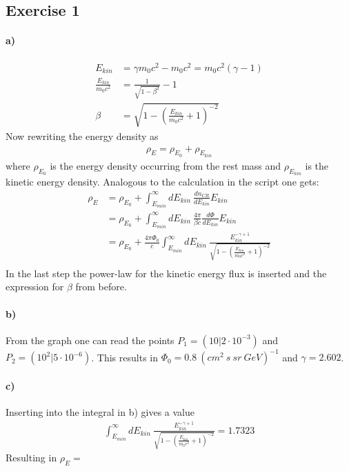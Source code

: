 \documentclass[10pt,a4paper]{article}
\begin{document}
\subsection*{Exercise 1}
\paragraph{a)}
\begin{align*}
E_{kin} &= \gamma m_0 c^2 - m_0 c^2 = m_0 c^2 (\gamma - 1) \\
\frac{E_{kin}}{m_0 c^2} &= \frac{1}{\sqrt{1-\beta^2}} - 1 \\
\beta &= \sqrt{1-\left(\frac{E_{kin}}{m_0 c^2} + 1\right)^{-2}}
\end{align*}
Now rewriting the energy density as
\begin{align*}
\rho_E = \rho_{E_0} + \rho_{E_{kin}}
\end{align*}
where $\rho_{E_0}$ is the energy density occurring from the rest mass and $\rho_{E_{kin}}$ is the kinetic energy density. Analogous to the calculation in the script one gets:
\begin{align*}
\rho_E &= \rho_{E_0} + \int_{E_{min}}^\infty dE_{kin}\ \frac{dn_{CR}}{dE_{kin}}E_{kin}\\
&=\rho_{E_0} + \int_{E_{min}}^\infty dE_{kin}\ \frac{4\pi}{\beta c}\frac{d\Phi}{dE_{kin}}E_{kin}\\
&=\rho_{E_0} + \frac{4\pi \Phi_0}{c} \int_{E_{min}}^\infty dE_{kin}\ \frac{E_{kin}^{-\gamma+1}}{\sqrt{1-\left(\frac{E_{kin}}{m_0 c^2} + 1\right)^{-2}}}\\
\end{align*}
In the last step the power-law for the kinetic energy flux is inserted and the expression for $\beta$ from before.

\paragraph{b)}
From the graph one can read the points $P_1 = (10 | 2\cdot 10^{-3})$ and $P_2=(10^2 | 5 \cdot 10^{-6})$. This results in $\Phi_0 = 0.8\ (cm^2\ s\ sr\ GeV)^{-1}$ and $\gamma = 2.602$.

\paragraph{c)}
Inserting into the integral in b) gives a value
\begin{align*}
\int_{E_{min}}^\infty dE_{kin}\ \frac{E_{kin}^{-\gamma+1}}{\sqrt{1-\left(\frac{E_{kin}}{m_0 c^2} + 1\right)^{-2}}} = 1.7323
\end{align*}
Resulting in $\rho_E = $
\end{document}

